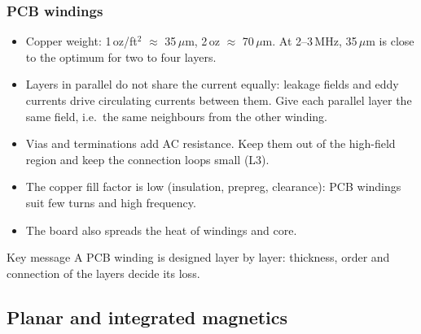 \begin{frame}
	\frametitle{PCB windings}
	\begin{itemize}
		\item Copper weight: 1\,oz/ft$^2$ $\approx$ 35\,$\mu$m, 2\,oz $\approx$ 70\,$\mu$m. At 2--3\,MHz, 35\,$\mu$m is close to the optimum for two to four layers.
		\item Layers in parallel do not share the current equally: leakage fields and eddy currents drive circulating currents between them. Give each parallel layer the same field, i.e.\ the same neighbours from the other winding.
		\item Vias and terminations add AC resistance. Keep them out of the high-field region and keep the connection loops small (L3).
		\item The copper fill factor is low (insulation, prepreg, clearance): PCB windings suit few turns and high frequency.
		\item The board also spreads the heat of windings and core.
	\end{itemize}
	\begin{block}{Key message}
		A PCB winding is designed layer by layer: thickness, order and connection of the layers decide its loss.
	\end{block}
\end{frame}

\subsection{Planar and integrated magnetics}

